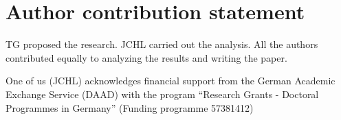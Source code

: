 \section{Author contribution statement}

TG proposed the research. JCHL carried out the analysis. All the authors
contributed equally to analyzing the results and writing the paper.

\begin{acknowledgement}
    One of us (JCHL) acknowledges financial support from the German Academic
    Exchange Service (DAAD) with the program ``Research Grants - Doctoral
    Programmes in Germany'' (Funding programme 57381412)
\end{acknowledgement}
